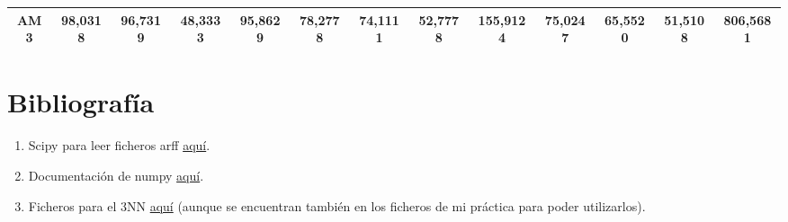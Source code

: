 \documentclass[12pt]{article}
\begin{document}
\begin{table}[H]
{\begin{tabular}{|c|cccc|cccc|cccc|}
AM3  & \multicolumn{1}{c|}{98,0318}                                                  & \multicolumn{1}{c|}{96,7319}                                                 & \multicolumn{1}{c|}{48,3333} & 95,8629 & \multicolumn{1}{c|}{78,2778}                                                  & \multicolumn{1}{c|}{74,1111}                                                 & \multicolumn{1}{c|}{52,7778} & 155,9124 & \multicolumn{1}{c|}{75,0247}                                                  & \multicolumn{1}{c|}{65,5520}                                                 & \multicolumn{1}{c|}{51,5108} & 806,5681 \\ \hline
\end{tabular}}
\end{table}



\section{Bibliografía}
\begin{enumerate}
\item Scipy para leer ficheros arff \href{arff http://docs.scipy.org/doc/scipy/reference/generated/scipy.io.arff.loadarff.html}{aquí}.
\item Documentación de numpy \href{http://docs.scipy.org/doc/numpy/user/index.html}{aquí}.
\item Ficheros para el 3NN \href{https://github.com/agarciamontoro/metaheuristics/tree/master/src/knnGPU}{aquí} (aunque se encuentran también en los ficheros de mi práctica para poder utilizarlos).
\end{enumerate}
\end{document}
